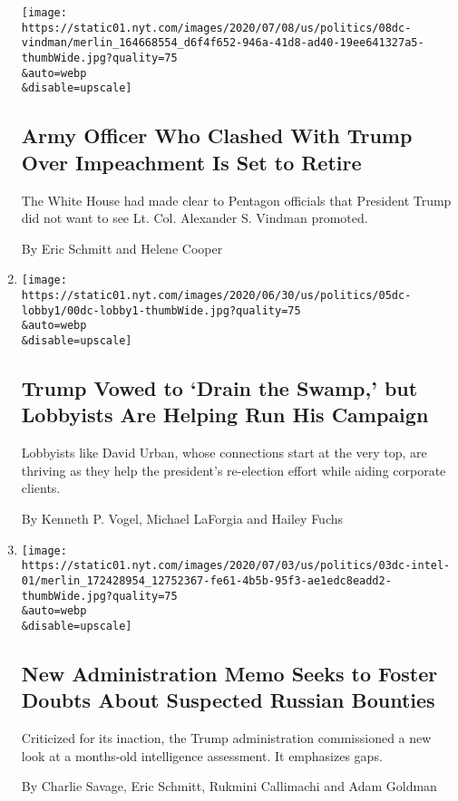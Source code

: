 \begin{enumerate}
  \texttt{[image: https://static01.nyt.com/images/2020/07/08/us/politics/08dc-vindman/merlin\_164668554\_d6f4f652-946a-41d8-ad40-19ee641327a5-thumbWide.jpg?quality=75\\\&auto=webp\\\&disable=upscale]}

  \hypertarget{army-officer-who-clashed-with-trump-over-impeachment-is-set-to-retire}{%
  \subsection{Army Officer Who Clashed With Trump Over Impeachment Is
  Set to
  Retire}\label{army-officer-who-clashed-with-trump-over-impeachment-is-set-to-retire}}

  The White House had made clear to Pentagon officials that President
  Trump did not want to see Lt. Col. Alexander S. Vindman promoted.

  By Eric Schmitt and Helene Cooper
\item
  \href{/2020/07/06/us/politics/trump-lobbyists-swamp-campaign.html}{}

  \texttt{[image: https://static01.nyt.com/images/2020/06/30/us/politics/05dc-lobby1/00dc-lobby1-thumbWide.jpg?quality=75\\\&auto=webp\\\&disable=upscale]}

  \hypertarget{trump-vowed-to-drain-the-swamp-but-lobbyists-are-helping-run-his-campaign}{%
  \subsection{Trump Vowed to `Drain the Swamp,' but Lobbyists Are
  Helping Run His
  Campaign}\label{trump-vowed-to-drain-the-swamp-but-lobbyists-are-helping-run-his-campaign}}

  Lobbyists like David Urban, whose connections start at the very top,
  are thriving as they help the president's re-election effort while
  aiding corporate clients.

  By Kenneth P. Vogel, Michael LaForgia and Hailey Fuchs
\item
  \href{/2020/07/03/us/politics/memo-russian-bounties.html}{}

  \texttt{[image: https://static01.nyt.com/images/2020/07/03/us/politics/03dc-intel-01/merlin\_172428954\_12752367-fe61-4b5b-95f3-ae1edc8eadd2-thumbWide.jpg?quality=75\\\&auto=webp\\\&disable=upscale]}

  \hypertarget{new-administration-memo-seeks-to-foster-doubts-about-suspected-russian-bounties}{%
  \subsection{New Administration Memo Seeks to Foster Doubts About
  Suspected Russian
  Bounties}\label{new-administration-memo-seeks-to-foster-doubts-about-suspected-russian-bounties}}

  Criticized for its inaction, the Trump administration commissioned a
  new look at a months-old intelligence assessment. It emphasizes gaps.

  By Charlie Savage, Eric Schmitt, Rukmini Callimachi and Adam Goldman
\end{enumerate}

